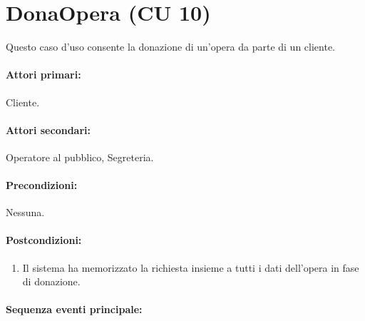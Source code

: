 \documentclass{article}
\begin{document}
\pagebreak 

		\section*{DonaOpera (CU 10)}
	
	\indent\indent Questo caso d'uso consente la donazione di un'opera da parte di un cliente.
	
	\paragraph{Attori primari:}Cliente.
	
	\paragraph{Attori secondari:}Operatore al pubblico, Segreteria.
	
	\paragraph{Precondizioni:}Nessuna.
	
	\paragraph{Postcondizioni:}
		\begin{enumerate}[itemsep=8pt,parsep=0pt]
				\item Il sistema ha memorizzato la richiesta insieme a tutti i dati dell'opera in fase di donazione.
		\end{enumerate}	
	
	\paragraph{Sequenza eventi principale:}
\end{document}
